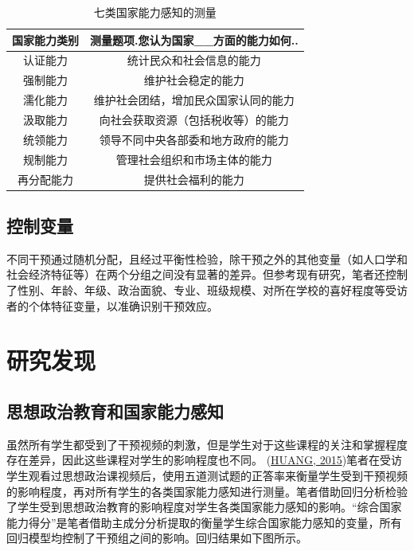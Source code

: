 \documentclass[
  12pt,
]{ctexart}
\begin{document}
\begin{table}[!h]

\caption{\label{tab:unnamed-chunk-2}七类国家能力感知的测量}
\centering
\begin{tabular}[t]{cc}
\toprule
国家能力类别 & 测量题项.您认为国家\_\_方面的能力如何..\\
\midrule
认证能力 & 统计民众和社会信息的能力\\
强制能力 & 维护社会稳定的能力\\
濡化能力 & 维护社会团结，增加民众国家认同的能力\\
汲取能力 & 向社会获取资源（包括税收等）的能力\\
统领能力 & 领导不同中央各部委和地方政府的能力\\
\addlinespace
规制能力 & 管理社会组织和市场主体的能力\\
再分配能力 & 提供社会福利的能力\\
\bottomrule
\end{tabular}
\end{table}

\hypertarget{ux63a7ux5236ux53d8ux91cf}{%
\subsection{控制变量}\label{ux63a7ux5236ux53d8ux91cf}}

不同干预通过随机分配，且经过平衡性检验，除干预之外的其他变量（如人口学和社会经济特征等）在两个分组之间没有显著的差异。但参考现有研究，笔者还控制了性别、年龄、年级、政治面貌、专业、班级规模、对所在学校的喜好程度等受访者的个体特征变量，以准确识别干预效应。

\hypertarget{ux7814ux7a76ux53d1ux73b0}{%
\section{研究发现}\label{ux7814ux7a76ux53d1ux73b0}}

\hypertarget{ux601dux60f3ux653fux6cbbux6559ux80b2ux548cux56fdux5bb6ux80fdux529bux611fux77e5}{%
\subsection{思想政治教育和国家能力感知}\label{ux601dux60f3ux653fux6cbbux6559ux80b2ux548cux56fdux5bb6ux80fdux529bux611fux77e5}}

虽然所有学生都受到了干预视频的刺激，但是学生对于这些课程的关注和掌握程度存在差异，因此这些课程对学生的影响程度也不同。 (\protect\hyperlink{ref-Huang2015a}{HUANG, 2015})笔者在受访学生观看过思想政治课视频后，使用五道测试题的正答率来衡量学生受到干预视频的影响程度，再对所有学生的各类国家能力感知进行测量。笔者借助回归分析检验了学生受到思想政治教育的影响程度对学生各类国家能力感知的影响。``综合国家能力得分''是笔者借助主成分分析提取的衡量学生综合国家能力感知的变量，所有回归模型均控制了干预组之间的影响。回归结果如下图所示。
\end{document}
